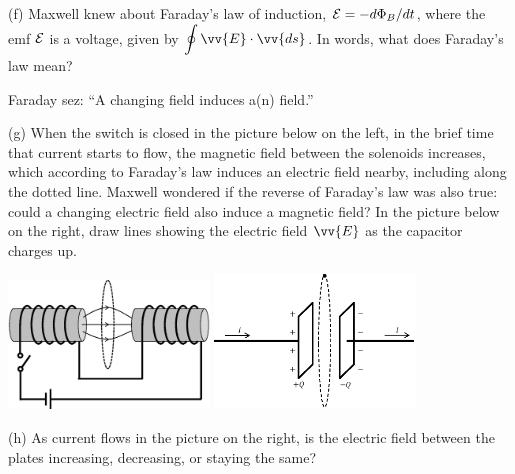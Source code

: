 (f) Maxwell knew about Faraday's law of induction, ${\cal E}=-d \Phi_B/dt$, where the emf ${\cal E}$ is a voltage, given by $\displaystyle \oint \vv{E} \cdot \vv{ds}$.  In words, what does Faraday's law mean?
\begin{center}
Faraday sez: ``A changing \underline{\hspace{1in}} field induces a(n) \underline{\hspace{1in}} field.''
\end{center}
(g) When the switch is closed in the picture below on the left, in the brief time that current starts to flow, the magnetic field between the solenoids increases, which according to Faraday's law induces an electric field nearby, including along the dotted line.  Maxwell wondered if the reverse of Faraday's law was also true: could a changing electric field also induce a magnetic field?  In the picture below on the right, draw lines showing the electric field $\vv{E}$ as the capacitor charges up. 
\begin{center}
\vspace{-0.1in}
    \includegraphics[width=0.4\textwidth]{deriving_em_waves/faradays_law.eps}
    \hspace{0.5in}
    \includegraphics[width=0.4\textwidth]{deriving_em_waves/capacitor_and_loop.eps}
\vspace{-0.1in}
\end{center}

(h) As current flows in the picture on the right, is the electric field between the plates increasing, decreasing, or staying the same?
\answerspace{0.3in}

